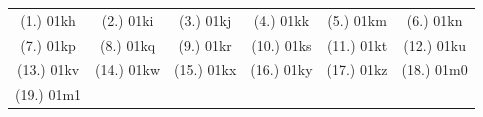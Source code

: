\begin{eocexercises}{}
\par \practiceinfo
\par \begin{tabular}[h]{cccccc}
(1.)	01kh	&
(2.)	01ki	&
(3.)	01kj	&
(4.)	01kk	&
(5.)	01km	&
(6.)	01kn	\\ %
(7.)	01kp	&
(8.)	01kq	&
(9.)	01kr	&
(10.)	01ks	&
(11.)	01kt	&
(12.)	01ku	\\ %
(13.)	01kv	&
(14.)	01kw	&
(15.)	01kx	&
(16.)	01ky	&
(17.)	01kz	&
(18.)	01m0	\\ %
(19.)	01m1	&
\end{tabular}
\end{eocexercises}






